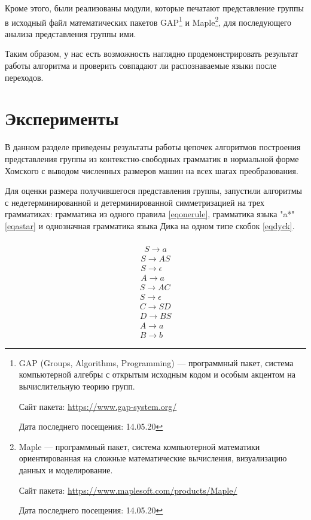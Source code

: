 \documentclass[14pt]{matmex-diploma-custom}
\begin{document}
Кроме этого, были реализованы модули, которые печатают представление группы в исходный файл математических пакетов GAP\footnote{GAP (Groups, Algorithms, Programming) --- программный пакет, система компьютерной алгебры с открытым исходным кодом и особым акцентом на вычислительную теорию групп.

Сайт пакета: \url{https://www.gap-system.org/}

Дата последнего посещения: 14.05.20} и Maple\footnote{Maple --- программный пакет, система компьютерной математики ориентированная на сложные математические вычисления, визуализацию данных и моделирование.

Сайт пакета: \url{https://www.maplesoft.com/products/Maple/}

Дата последнего посещения: 14.05.20}, для последующего анализа представления группы ими. 

Таким образом, у нас есть возможность наглядно продемонстрировать результат работы алгоритма и проверить совпадают ли распознаваемые языки после переходов. 

\section{Эксперименты}
В данном разделе приведены результаты работы цепочек алгоритмов построения представления группы из контекстно-свободных грамматик в нормальной форме Хомского с выводом численных размеров машин на всех шагах преобразования. 

Для оценки размера получившегося представления группы, запустили
алгоритмы с недетерминированной и детерминированной
симметризацией на трех грамматиках: грамматика из одного правила \eqref{eqonerule},
грамматика языка "a*" \eqref{eqastar} и однозначная грамматика языка Дика на одном типе скобок \eqref{eqdyck}.

\begin{multicols}{2}
\noindent
\centering
    \begin{align}
        \nonumber \\ S \to a \label{eqonerule}
    \end{align}
    \begin{align}
        S \to AS \nonumber \\
        S \to \epsilon \label{eqastar} \\
        A \to a \nonumber
    \end{align}
    \begin{align}
        S \to AC \nonumber \\
        S \to \epsilon \nonumber \\
        C \to SD \label{eqdyck} \\
        D \to BS \nonumber \\
        A \to a \nonumber \\
        B \to b \nonumber
    \end{align}
\end{multicols}
\end{document}
